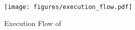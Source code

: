 

\begin{figure}[htbp]
    \centering
    \texttt{[image: figures/execution\_flow.pdf]}
    \caption{Execution Flow of \Chain}
    \label{fig:execution_flow}
\end{figure}